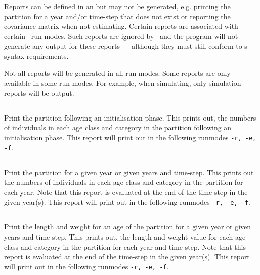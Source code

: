 Reports can be defined in an  but may not be generated, e.g. printing the partition for a year and/or time-step that does not exist or reporting the covariance matrix when not estimating. Certain reports are associated with certain \CNAME\ run modes. Such reports are ignored by \CNAME\ and the program will not generate any output for these reports --- although they must still conform to \CNAME s syntax requirements.

Not all reports will be generated in all run modes. Some reports are only available in some run modes. For example, when simulating, only simulation reports will be output.

\subsection{}

Print the partition following an initialisation phase. This prints out, the numbers of individuals in each age class and category in the partition following an initialisation phase. This report will print out in the following runmodes \texttt{-r, -e, -f}.

\subsection{}

Print the partition for a given year or given years and time-step. This prints out the numbers of individuals in each age class and category in the partition for each year. Note that this report is evaluated at the end of the time-step in the given year(s). This report will print out in the following runmodes \texttt{-r, -e, -f}.


\subsection{}

Print the length and weight for an age of the partition for a given year or given years and time-step. This prints out, the length and weight value for each age class and category in the partition for each year and time step. Note that this report is evaluated at the end of the time-step in the given year(s). This report will print out in the following runmodes \texttt{-r, -e, -f}.

